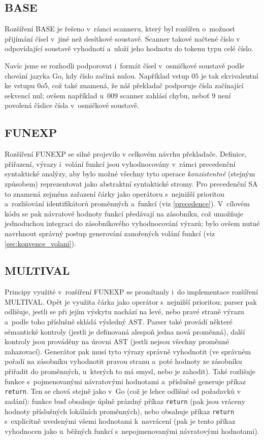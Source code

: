 \documentclass[11pt]{article}
\begin{document}
\subsection{BASE}
Rozšíření BASE je řešeno v~rámci scanneru, který byl rozšířen o~možnost přijímání čísel v~jiné než desítkové soustavě. Scanner takové načtené číslo v odpovídající soustavě vyhodnotí a~uloží jeho hodnotu do tokenu typu celé číslo.

Navíc jsme se rozhodli podporovat i~formát čísel v~osmičkové soustavě podle chování jazyka Go, kdy číslo začíná nulou. Například vstup $05$ je tak ekvivalentní ke vstupu $0o5$, což také znamená, že náš překladač podporuje čísla začínající sekvencí nul; ovšem například u~$009$ scanner zahlásí chybu, neboť $9$ není povolená číslice čísla v~osmičkové soustavě.

\subsection{FUNEXP}
Rozšíření FUNEXP se silně projevilo v celkovém návrhu překladače. Definice, přiřazení, výrazy i~volání funkcí jsou vyhodnocovány v~rámci precedenční syntaktické analýzy, aby bylo možné všechny tyto operace \emph{konzistentně} (stejným způsobem) reprezentovat jako abstraktní syntaktické stromy. Pro precedenční SA to znamená zejména zařazení čárky jako operátoru s~nejnižší prioritou a~rozlišování identifikátorů proměnných a~funkcí (viz \ref{precedence}). V~cílovém kódu se pak návratové hodnoty funkcí předávají na zásobníku, což umožňuje jednoduchou integraci do zásobníkového vyhodnocování výrazů; bylo ovšem nutné navrhnout správný postup generování zanořených volání funkcí (viz \ref{sec:konvence_volani}).

\subsection{MULTIVAL}
Principy využité v~rozšíření FUNEXP se promítnuly i~do implementace rozšíření MULTIVAL. Opět je využita čárka jako operátor s~nejnižší prioritou; parser pak odlišuje, jestli se při jejím výskytu nachází na levé, nebo pravé straně výrazu a~podle toho příslušně skládá výsledný AST. Parser také provádí některé sémantické kontroly (jestli je definovaná alespoň jedna nová proměnná), další kontroly jsou prováděny na úrovni AST (jestli nejsou všechny proměnné zahazovací). Generátor pak musí tyto výrazy správně vyhodnotit (ve správném pořadí na zásobníku vyhodnotit pravou stranu a~poté hodnoty ze zásobníku přiřadit do proměnných, u~kterých to má smysl, nebo je zahodit). Také rozlišuje funkce s~pojmenovanými návratovými hodnotami a~příslušně generuje příkaz \texttt{return}. Ten se chová stejně jako v~Go (což je lehce odlišné od požadavků v zadání): funkce buď obsahuje úplně prázdný příkaz \texttt{return} (pak jsou vráceny hodnoty příslušných lokálních proměnných), nebo obsahuje příkaz \texttt{return} s~explicitně uvedenými všemi hodnotami k~navrácení (pak je tento příkaz vyhodnocen jako u~běžných funkcí s~nepojmenovanými návratovými hodnotami).
\end{document}
